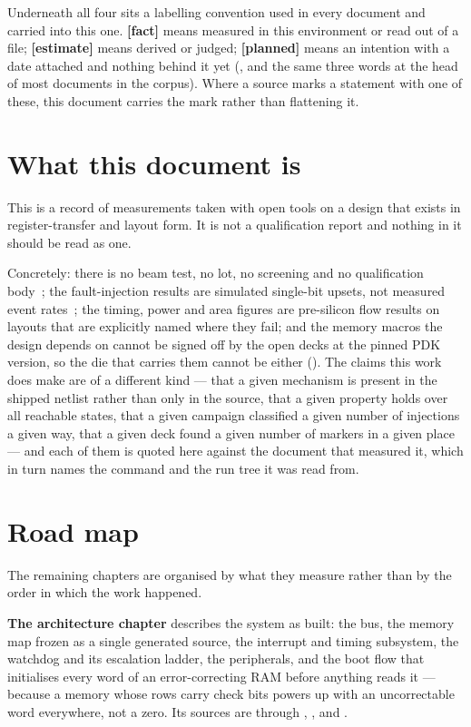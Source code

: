 Underneath all four sits a labelling convention used in every document
and carried into this one. \textbf{[fact]} means measured in this
environment or read out of a file; \textbf{[estimate]} means derived or
judged; \textbf{[planned]} means an intention with a date attached and
nothing behind it yet (, and the same three words at
the head of most documents in the corpus). Where a source marks a
statement with one of these, this document carries the mark rather than
flattening it.

\section{What this document is}
\label{sec:intro-status}

This is a record of measurements taken with open tools on a design that
exists in register-transfer and layout form. It is not a qualification
report and nothing in it should be read as one.

Concretely: there is no beam test, no lot, no screening and no
qualification body~\cite{ecss60_15c}; the fault-injection results are
simulated single-bit upsets, not measured event rates~\cite{nijsink2026};
the timing, power and area figures are pre-silicon flow results on layouts that are explicitly named where they
fail; and the memory macros the design depends on cannot be signed off
by the open decks at the pinned PDK version, so the die that carries
them cannot be either (). The claims this work
does make are of a different kind --- that a given mechanism is present
in the shipped netlist rather than only in the source, that a given
property holds over all reachable states, that a given campaign
classified a given number of injections a given way, that a given deck
found a given number of markers in a given place --- and each of them is
quoted here against the document that measured it, which in turn names
the command and the run tree it was read from.

\section{Road map}
\label{sec:intro-roadmap}

The remaining chapters are organised by what they measure rather than by
the order in which the work happened.

\textbf{The architecture chapter} describes the system as built: the
bus, the memory map frozen as a single generated source, the interrupt
and timing subsystem, the watchdog and its escalation ladder, the
peripherals, and the boot flow that initialises every word of an
error-correcting RAM before anything reads it --- because a memory whose
rows carry check bits powers up with an uncorrectable word everywhere,
not a zero. Its sources are  through ,
,  and .

